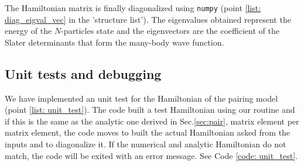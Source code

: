 \documentclass[twoside]{article}
\begin{document}
The Hamiltonian matrix is finally diagonalized using \texttt{numpy} (point \ref{list: diag_eigval_vec} in the 'structure list'). The eigenvalues obtained represent the energy of the $N$-particles state and the eigenvectors are the coefficient of the Slater determinants that form the many-body wave function. %


\subsection{Unit tests and debugging}

We have implemented an unit test for the Hamiltonian of the pairing model (point \ref{list: unit_test}). The code built a test Hamiltonian using our routine and if this is the same as the analytic one derived in Sec.\ref{sec:pair}, matrix element per matrix element, the code moves to built the actual Hamiltonian asked from the inputs and to diagonalize it. %
If the numerical and analytic Hamiltonian do not match, the code will be exited with an error message. See Code \ref{code: unit_test}.
\end{document}
